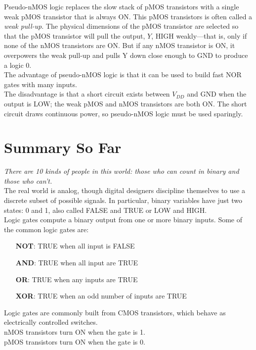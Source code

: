 \documentclass[12pt]{article}
\theoremstyle{definition}
\begin{document}
  Pseudo-nMOS logic replaces the slow stack of pMOS transistors with a single weak pMOS transistor that is always ON.
  This pMOS transistors is often called a \emph{weak pull-up}.
  The physical dimensions of the pMOS transistor are selected so that the pMOS transistor will pull the output, $Y$, HIGH weakly---that is, only if none of the nMOS transistors are ON.
  But if any nMOS transistor is ON, it overpowers the weak pull-up and pulls Y down close enough to GND to produce a logic 0. \\

  The advantage of pseudo-nMOS logic is that it can be used to build fast NOR gates with many inputs. \\
  The disadvantage is that a short circuit exists between $V_{DD}$ and GND when the output is LOW; the weak pMOS and nMOS transistors are both ON.
  The short circuit draws continuous power, so pseudo-nMOS logic must be used sparingly.

  \newpage
  \section{Summary So Far}
  \emph{There are 10 kinds of people in this world: those who can count in
binary and those who can't.} \\
  The real world is analog, though digital designers discipline themselves to use a discrete subset of possible signals.
  In particular, binary variables have just two states: 0 and 1, also called FALSE and TRUE or LOW and HIGH. \\

  Logic gates compute a binary output from one or more binary inputs.
  Some of the common logic gates are:
  \begin{itemize}
    \item[\textbf{NOT}:] TRUE when all input is FALSE
    \item[\textbf{AND}:] TRUE when all input are TRUE
    \item[\textbf{OR}:]  TRUE when any inputs are TRUE
    \item[\textbf{XOR}:] TRUE when an odd number of inputs are TRUE
  \end{itemize}

  Logic gates are commonly built from CMOS transistors, which behave as electrically controlled switches. \\
  nMOS transistors turn ON when the gate is 1. \\
  pMOS transistors turn ON when the gate is 0.
\end{document}
